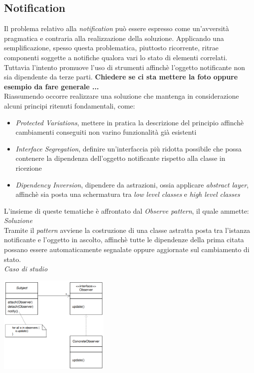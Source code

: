 \documentclass{article}
\begin{document}
\subsection*{Notification}
\large
Il problema relativo alla \textit{notification} può essere espresso come un'avversità pragmatica e contraria alla realizzazione della soluzione. Applicando una semplificazione, spesso questa problematica, piuttosto ricorrente, ritrae componenti soggette a notifiche qualora vari lo stato di elementi correlati. Tuttavia l'intento promuove l'uso di strumenti affinchè l'oggetto notificante non sia dipendente da terze parti. \textbf{Chiedere se ci sta mettere la foto oppure esempio da fare generale ...}\vspace*{14pt}\\
Riassumendo occorre realizzare una soluzione che mantenga in considerazione alcuni principi ritenuti fondamentali, come:
\begin{itemize}[label={-}]
    \itemsep0em
    \item \textit{Protected Variations}, mettere in pratica la descrizione del principio affinchè cambiamenti conseguiti non varino funzionalità già esistenti
    \item \textit{Interface Segregation}, definire un'interfaccia più ridotta possibile che possa contenere la dipendenza dell'oggetto notificante rispetto alla classe in ricezione
    \item \textit{Dipendency Inversion}, dipendere da astrazioni, ossia applicare \textit{abstract layer}, affinchè sia posta una schermatura tra \textit{low level classes} e \textit{high level classes}
\end{itemize}
L'insieme di queste tematiche è affrontato dal \textit{Observe pattern}, il quale ammette:\vspace*{7pt}\\
\textit{Soluzione}\\
Tramite il \textit{pattern} avviene la costruzione di una classe astratta posta tra l'istanza notificante e l'oggetto in ascolto, affinchè tutte le dipendenze della prima citata possano essere automaticamente segnalate oppure aggiornate sul cambiamento di stato.\vspace*{14pt}\\
\textit{Caso di studio}\\
\begin{center}
    \includegraphics[width=0.4\textwidth]{foto 3.png}
\end{center}
\end{document}
